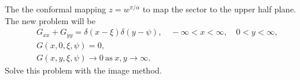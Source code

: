 {%
\begin{Hint}
  The the conformal mapping $z = w^{\pi/\alpha}$ to map the sector to the 
  upper half plane.  The new problem will be
  \begin{align*}
    &G_{x x} + G_{y y} = \delta(x - \xi) \delta(y - \psi), 
    \quad -\infty < x < \infty, \quad 0 < y < \infty, \\
    &G(x,0,\xi,\psi) = 0, \\
    &G(x,y,\xi,\psi) \to 0\ \mathrm{as}\ x,y \to \infty.
  \end{align*}
  Solve this problem with the image method.
\end{Hint}






\begin{Hint}
\end{Hint}





\begin{Hint}
\end{Hint}




\begin{Hint}
\end{Hint}






\raggedbottom
}

